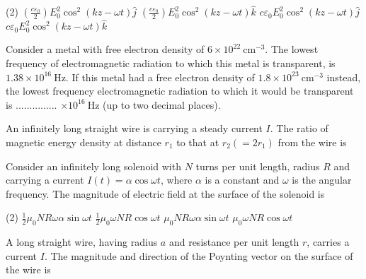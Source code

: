 \begin{enumerate}
\begin{tasks}(2)
	\task[\textbf{A.}] $\left(\frac{c \varepsilon_{0}}{2}\right) E_{0}^{2} \cos ^{2}(k z-\omega t) \hat{j}$
	\task[\textbf{B.}]$\left(\frac{c \varepsilon_{0}}{2}\right) E_{0}^{2} \cos ^{2}(k z-\omega t) \hat{k}$
	\task[\textbf{C.}] $c \varepsilon_{0} E_{0}^{2} \cos ^{2}(k z-\omega t) \hat{j}$
	\task[\textbf{D.}]$c \varepsilon_{0} E_{0}^{2} \cos ^{2}(k z-\omega t) \hat{k}$
\end{tasks}
\begin{minipage}{\textwidth}
	\item Consider a metal with free electron density of $6 \times 10^{22} \mathrm{~cm}^{-3}$. The lowest frequency of electromagnetic radiation to which this metal is transparent, is $1.38 \times 10^{16} \mathrm{~Hz}$. If this metal had a free electron density of $1.8 \times 10^{23} \mathrm{~cm}^{-3}$ instead, the lowest frequency electromagnetic radiation to which it would be transparent is ............... $\times 10^{16} \mathrm{~Hz}$ (up to two decimal places).
\end{minipage}
\begin{minipage}{\textwidth}
	\item An infinitely long straight wire is carrying a steady current $I$. The ratio of magnetic energy density at distance $r_{1}$ to that at $r_{2}\left(=2 r_{1}\right)$ from the wire is
\end{minipage}
\begin{minipage}{\textwidth}
	\item Consider an infinitely long solenoid with $N$ turns per unit length, radius $R$ and carrying a current $I(t)=\alpha \cos \omega t$, where $\alpha$ is a constant and $\omega$ is the angular frequency. The magnitude of electric field at the surface of the solenoid is
\end{minipage}
\begin{tasks}(2)
	\task[\textbf{A.}] $\frac{1}{2} \mu_{0} N R \omega \alpha \sin \omega t$
	\task[\textbf{B.}]$\frac{1}{2} \mu_{0} \omega N R \cos \omega t$
	\task[\textbf{C.}]$\mu_{0} N R \omega \alpha \sin \omega t$
	\task[\textbf{D.}]$\mu_{0} \omega N R \cos \omega t$
\end{tasks}
\begin{minipage}{\textwidth}
	\item A long straight wire, having radius $a$ and resistance per unit length $r$, carries a current $I$. The magnitude and direction of the Poynting vector on the surface of the wire is

\end{minipage}
\end{enumerate}
